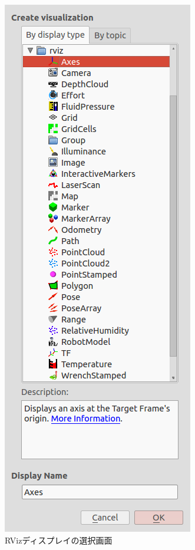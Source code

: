 \begin{figure}[h]
  \centering
  \includegraphics[width=\columnwidth]{pictures/chapter5/pic_05_06.png}
  \caption{RVizディスプレイの選択画面}
\end{figure}

